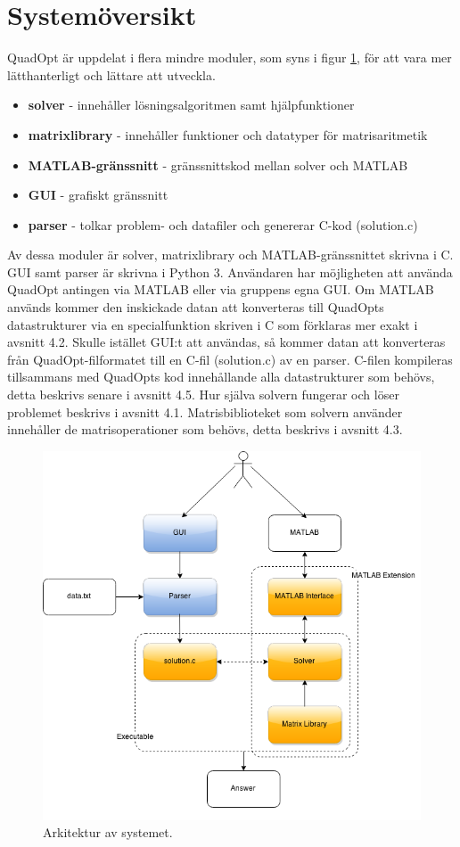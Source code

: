 \newpage
\section{Systemöversikt}
QuadOpt är uppdelat i flera mindre moduler, som syns i figur \ref{fig:arkitektur}, för att vara mer lätthanterligt och lättare att utveckla.

\begin{itemize}
\item \textbf{solver} - innehåller lösningsalgoritmen samt hjälpfunktioner
\item \textbf{matrixlibrary} - innehåller funktioner och datatyper för matrisaritmetik
\item \textbf{MATLAB-gränssnitt} - gränssnittskod mellan solver och MATLAB
\item \textbf{GUI} - grafiskt gränssnitt
\item \textbf{parser} - tolkar problem- och datafiler och genererar C-kod (solution.c)
\end{itemize}

\noindent Av dessa moduler är solver, matrixlibrary och MATLAB-gränssnittet skrivna i C. GUI samt parser är skrivna i Python 3.
\newline
\newline
Användaren har möjligheten att använda QuadOpt antingen via MATLAB eller via gruppens egna GUI. Om MATLAB används kommer den inskickade datan att konverteras till QuadOpts datastrukturer via en specialfunktion skriven i C som förklaras mer exakt i avsnitt 4.2. Skulle istället GUI:t att användas, så kommer datan att konverteras från QuadOpt-filformatet till en C-fil (solution.c) av en parser. C-filen kompileras tillsammans med QuadOpts kod innehållande alla datastrukturer som behövs, detta beskrivs senare i avsnitt 4.5. Hur själva solvern fungerar och löser problemet beskrivs i avsnitt 4.1. Matrisbiblioteket som solvern använder innehåller de matrisoperationer som behövs, detta beskrivs i avsnitt 4.3.

\begin{figure}[H]
\centering
\includegraphics[scale=0.5]{bilder/arkitektur.png}
\caption{Arkitektur av systemet.}
\label{fig:arkitektur}
\end{figure}
